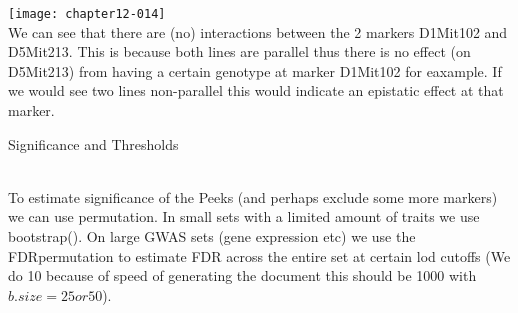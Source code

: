 \documentclass[a4paper]{article}
\begin{document}
\texttt{[image: chapter12-014]}
\\
We can see that there are (no) interactions between the 2 markers D1Mit102 and D5Mit213. This is because both lines are parallel thus there is no effect (on D5Mit213) from having a certain genotype at marker D1Mit102 for eaxample. If we would see two lines non-parallel this would indicate an epistatic effect at that marker. 
\clearpage
\begin{Large} Significance and Thresholds \end{Large}\\
To estimate significance of the Peeks (and perhaps exclude some more markers) we can use permutation.
In small sets with a limited amount of traits we use bootstrap(). On large GWAS sets (gene expression etc) we use the FDRpermutation to estimate FDR across the entire set at certain lod cutoffs (We do 10 because of speed of generating the document this should be 1000 with $b.size=25 or 50$).
\\
\end{document}
